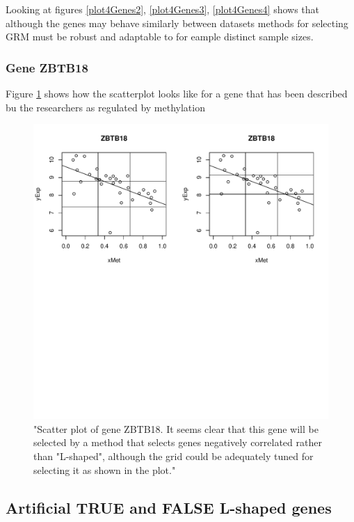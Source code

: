 \documentclass[a4paper,10pt]{article}\usepackage[]{graphicx}\usepackage[]{xcolor}
\makeatletter
\def\maxwidth{ %
  \ifdim\Gin@nat@width>\linewidth
    \linewidth
  \else
    \Gin@nat@width
  \fi
}
\newenvironment{knitrout}{}{} %
\makeatother
\begin{document}
Looking at figures \ref{plot4Genes2}, \ref{plot4Genes3}, \ref{plot4Genes4} shows that although the genes may behave similarly  between datasets methods for selecting GRM must be robust and adaptable to for eample distinct sample sizes.

\subsubsection{Gene ZBTB18}

Figure \ref{plotZBTB18} shows how the scatterplot looks like for a gene that has been described bu the researchers as regulated by methylation

\begin{figure}
\begin{knitrout}
\color{fgcolor}
\includegraphics[width=\maxwidth]{figure/plotZBTB18-1} 
\end{knitrout}
\caption{"Scatter plot of gene ZBTB18. It seems clear that this gene will be selected by a method that selects genes negatively correlated rather than "L-shaped", although the grid could be adequately tuned for selecting it as shown in the plot."\label{plotZBTB18}}
\end{figure}


\subsection{Artificial TRUE and FALSE L-shaped genes}
\end{document}

